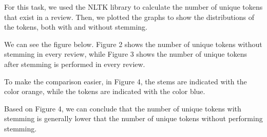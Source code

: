 For this task, we used the NLTK library to calculate the number of unique tokens that exist in a review. Then, we plotted the graphs to show the distributions of the tokens, both with and without stemming.

We can see the figure below. Figure 2 shows the number of unique tokens without stemming in every review, while Figure 3 shows the number of unique tokens after stemming is performed in every review.

To make the comparison easier, in Figure 4, the stems are indicated with the color orange, while the tokens are indicated with the color blue.

Based on Figure 4, we can conclude that the number of unique tokens with stemming is generally lower that the number of unique tokens without performing stemming.
